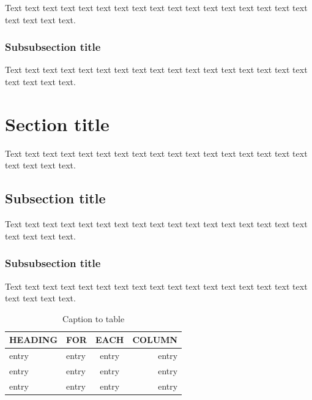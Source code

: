 \documentclass{iucrjournals}
\begin{document}
Text text text text text text text text text text text text text text
text text text text text text text.

\subsubsection{Subsubsection title}

Text text text text text text text text text text text text text text
text text text text text text text.



\section{Section title}

Text text text text text text text text text text text text text text
text text text text text text text.

\subsection{Subsection title}

Text text text text text text text text text text text text text text
text text text text text text text.

\subsubsection{Subsubsection title}

Text text text text text text text text text text text text text text
text text text text text text text.


\begin{table}[ht]
\caption{Caption to table \protect\cite{lamport86}} %
\smallskip
\begin{center}
\begin{tabular}{llcr}
\midrule
 HEADING    & FOR        & EACH       & COLUMN     \\
\midrule
 entry      & entry      & entry      & entry      \\
 entry      & entry      & entry      & entry      \\
 entry      & entry      & entry      & entry      \\
\end{tabular}
\end{center}
\end{table}
     
\end{document}
